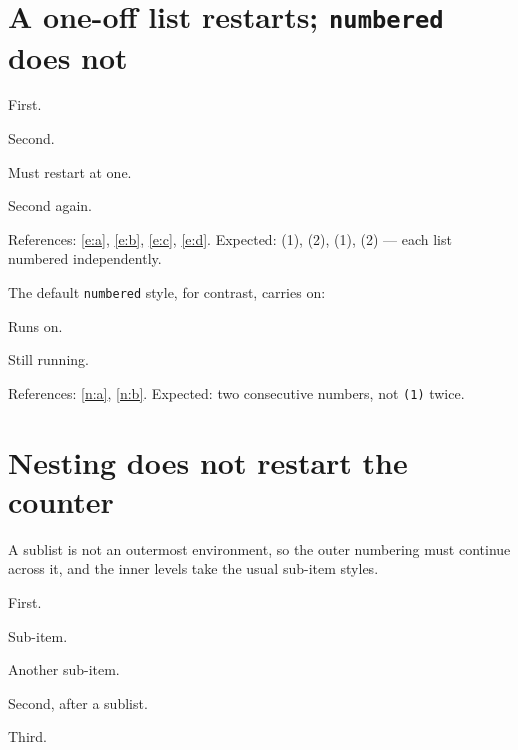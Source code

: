 \documentclass{article}
\begin{document}
\section{A one-off list restarts; \texttt{numbered} does not}

\begin{prop}[style=enum]
  \item First. \label{e:a}
  \item Second. \label{e:b}
\end{prop}

\begin{prop}[style=enum]
  \item Must restart at one. \label{e:c}
  \item Second again. \label{e:d}
\end{prop}

References: \ref{e:a}, \ref{e:b}, \ref{e:c}, \ref{e:d}.  Expected:
(1), (2), (1), (2) --- each list numbered independently.

The default \texttt{numbered} style, for contrast, carries on:

\begin{prop}
  \item Runs on. \label{n:a}
\end{prop}

\begin{prop}
  \item Still running. \label{n:b}
\end{prop}

References: \ref{n:a}, \ref{n:b}.  Expected: two consecutive numbers, not
\texttt{(1)} twice.

\section{Nesting does not restart the counter}

A sublist is not an outermost environment, so the outer numbering must
continue across it, and the inner levels take the usual sub-item styles.

\begin{prop}[style=enum]
  \item First. \label{e:n1}
  \begin{prop}
    \item Sub-item. \label{e:n1a}
    \item Another sub-item. \label{e:n1b}
  \end{prop}
  \item Second, after a sublist. \label{e:n2}
  \item Third. \label{e:n3}
\end{prop}
\end{document}
